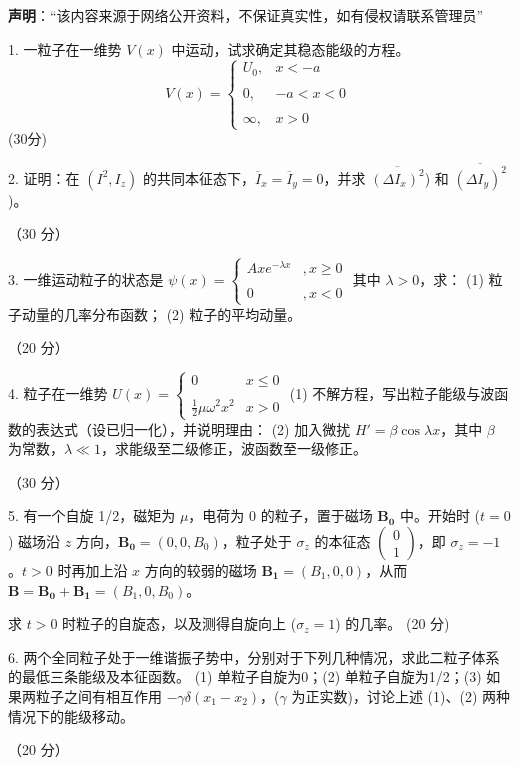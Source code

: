 
\textbf{声明}：“该内容来源于网络公开资料，不保证真实性，如有侵权请联系管理员”

1. 一粒子在一维势 \( V(x) \) 中运动，试求确定其稳态能级的方程。
$$V(x) = \begin{cases} U_0, & x < -a \\\\0, & -a < x < 0 \\\\\infty, & x > 0 \end{cases}~$$
(30分)

2. 证明：在 $\left( I^2, I_z \right)$ 的共同本征态下，$\overline{I}_x = \overline{I}_y = 0$，并求 $\overline{\left( \Delta I_x \right)^2}$) 和 $\overline{\left( \Delta I_y \right)^2}$)。

（30 分）

3. 一维运动粒子的状态是 $\psi(x) = \begin{cases} Axe^{-\lambda x} &, x \geq 0 \\\\0 & ,x < 0\end{cases}$
其中 $\lambda > 0$，求：
(1) 粒子动量的几率分布函数；
(2) 粒子的平均动量。

（20 分）

4. 粒子在一维势 $U(x) = \begin{cases} 0 & x \leq 0 \\\\ \frac{1}{2}\mu \omega^2 x^2 & x > 0 \end{cases}$
(1) 不解方程，写出粒子能级与波函数的表达式（设已归一化），并说明理由：
(2) 加入微扰 $H' = \beta \cos \lambda x$，其中 $\beta$ 为常数，$\lambda \ll 1$，求能级至二级修正，波函数至一级修正。

（30 分）

 5. 有一个自旋 1/2，磁矩为 $\mu$，电荷为 0 的粒子，置于磁场 $\mathbf{B_0}$ 中。开始时 ($t=0$) 磁场沿 $z$ 方向，$\mathbf{B_0} = (0, 0, B_0)$，粒子处于 $ \sigma_z$ 的本征态 $\begin{pmatrix} 0 \\ 1 \end{pmatrix}$，即 $ \sigma_z = -1$。$t>0$ 时再加上沿 $x$ 方向的较弱的磁场 $\mathbf{B_1} = (B_1, 0, 0)$，从而 $\mathbf{B} = \mathbf{B_0} + \mathbf{B_1} = (B_1, 0, B_0)$。

求 $t > 0$ 时粒子的自旋态，以及测得自旋向上 ($ \sigma_z = 1$) 的几率。 (20 分)

6. 两个全同粒子处于一维谐振子势中，分别对于下列几种情况，求此二粒子体系的最低三条能级及本征函数。 (1) 单粒子自旋为0；(2) 单粒子自旋为1/2；(3) 如果两粒子之间有相互作用 $-\gamma \delta(x_1 - x_2)$，($\gamma$ 为正实数)，讨论上述 (1)、(2) 两种情况下的能级移动。

（20 分）

